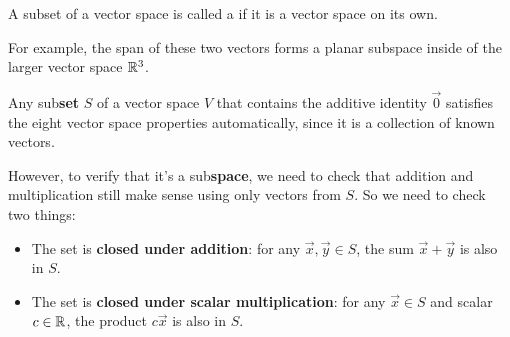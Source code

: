 
\begin{applicationActivities}



\begin{definition}
  A subset of a vector space is called a  if it is
  a vector space on its own.

  \vspace{1em}

  For example, the span of these two vectors forms a planar subspace
  inside of the larger vector space \(\mathbb{R}^3\).

  \begin{center}
  \end{center}
\end{definition}



\begin{fact}
  Any sub\textbf{set} \(S\) of a vector space \(V\) that contains
  the additive identity \(\vec 0\) satisfies the eight
  vector space properties automatically, since it is a collection of known
  vectors.

  \vspace{1em}

  However, to verify that it's a sub\textbf{space}, we need to check that
  addition and multiplication still make sense using only vectors from \(S\).
  So we need to check two things:

  \begin{itemize}
  \item The set is \textbf{closed under addition}: for any \(\vec{x},\vec{y} \in S\), the sum \(\vec{x}+\vec{y}\) is also in \(S\).
  \item The set is \textbf{closed under scalar multiplication}: for any \(\vec{x} \in S\) and scalar \(c \in \mathbb{R}\), the product \(c\vec{x}\) is also in \(S\).
\end{itemize}
\end{fact}


\end{applicationActivities}

